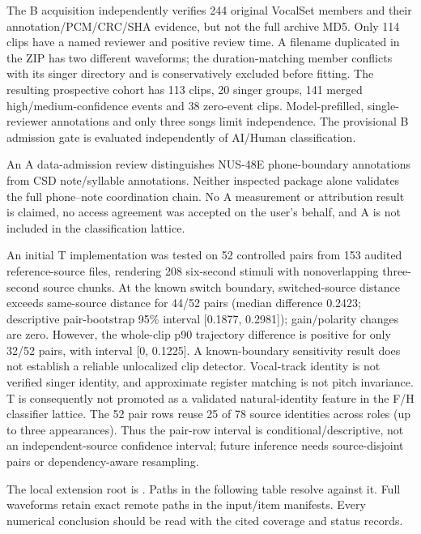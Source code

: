 The B acquisition independently verifies 244 original VocalSet members and
their annotation/PCM/CRC/SHA evidence, but not the full archive MD5. Only 114
clips have a named reviewer and positive review time. A filename duplicated in
the ZIP has two different waveforms; the duration-matching member conflicts
with its singer directory and is conservatively excluded before fitting.
The resulting prospective cohort has 113 clips, 20 singer groups, 141 merged
high/medium-confidence events and 38 zero-event clips. Model-prefilled,
single-reviewer annotations and only three songs limit independence. The
provisional B admission gate is evaluated independently of AI/Human classification.


An A data-admission review distinguishes NUS-48E phone-boundary annotations
from CSD note/syllable annotations. Neither inspected package alone validates
the full phone--note coordination chain. No A measurement or attribution result
is claimed, no access agreement was accepted on the user's behalf, and A is
not included in the classification lattice.

An initial T implementation was tested on 52 controlled pairs from 153 audited
reference-source files, rendering 208 six-second stimuli with nonoverlapping
three-second source chunks. At the known switch boundary, switched-source
distance exceeds same-source distance for 44/52 pairs (median difference
0.2423; descriptive pair-bootstrap 95\% interval [0.1877, 0.2981]); gain/polarity changes
are zero. However, the whole-clip p90 trajectory difference is positive for
only 32/52 pairs, with interval [0, 0.1225]. A known-boundary sensitivity result
does not establish a reliable unlocalized clip detector. Vocal-track identity
is not verified singer identity, and approximate register matching is not pitch
invariance. T is consequently not promoted as a validated natural-identity
feature in the F/H classifier lattice.
The 52 pair rows reuse 25 of 78 source identities across roles (up to three
appearances). Thus the pair-row interval is conditional/descriptive, not an
independent-source confidence interval; future inference needs source-disjoint
pairs or dependency-aware resampling.

The local extension root is
.
Paths in the following table resolve against it. Full waveforms retain exact
remote paths in the input/item manifests. Every numerical conclusion should be
read with the cited coverage and status records.

